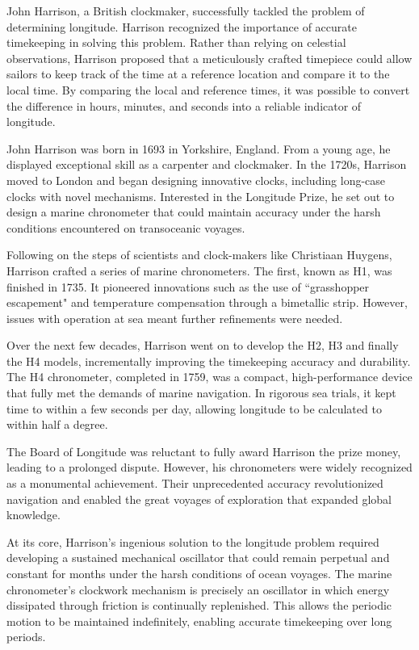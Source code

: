 John Harrison, a British clockmaker, successfully tackled the problem of determining longitude. Harrison recognized the importance of accurate timekeeping in solving this problem. Rather than relying on celestial observations, Harrison proposed that a meticulously crafted timepiece could allow sailors to keep track of the time at a reference location and compare it to the local time. By comparing the local and reference times, it was possible to convert the difference in hours, minutes, and seconds into a reliable indicator of longitude.

John Harrison was born in 1693 in Yorkshire, England. From a young age, he displayed exceptional skill as a carpenter and clockmaker. In the 1720s, Harrison moved to London and began designing innovative clocks, including long-case clocks with novel mechanisms. Interested in the Longitude Prize, he set out to design a marine chronometer that could maintain accuracy under the harsh conditions encountered on transoceanic voyages.

Following on the steps of scientists and clock-makers like Christiaan Huygens, Harrison crafted a series of marine chronometers. The first, known as H1, was finished in 1735. It pioneered innovations such as the use of ``grasshopper escapement" and temperature compensation through a bimetallic strip. However, issues with operation at sea meant further refinements were needed.

Over the next few decades, Harrison went on to develop the H2, H3 and finally the H4 models, incrementally improving the timekeeping accuracy and durability. The H4 chronometer, completed in 1759, was a compact, high-performance device that fully met the demands of marine navigation. In rigorous sea trials, it kept time to within a few seconds per day, allowing longitude to be calculated to within half a degree.

The Board of Longitude was reluctant to fully award Harrison the prize money, leading to a prolonged dispute. However, his chronometers were widely recognized as a monumental achievement. Their unprecedented accuracy revolutionized navigation and enabled the great voyages of exploration that expanded global knowledge.

At its core, Harrison's ingenious solution to the longitude problem required developing a sustained mechanical oscillator that could remain perpetual and constant for months under the harsh conditions of ocean voyages. The marine chronometer's clockwork mechanism is precisely an oscillator in which energy dissipated through friction is continually replenished. This allows the periodic motion to be maintained indefinitely, enabling accurate timekeeping over long periods.

